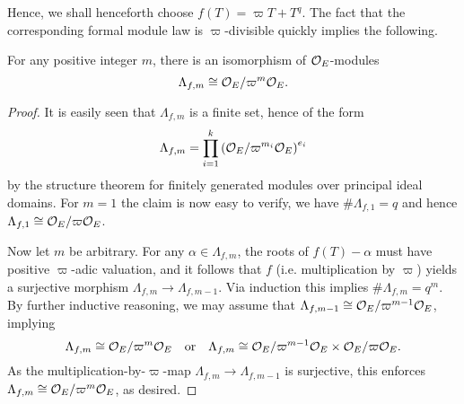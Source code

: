 \documentclass[../main.tex]{subfiles}
\begin{document}
Hence, we shall henceforth choose $f(T) = \varpi T + T^q$. 
The fact that the corresponding formal module law is $\varpi$-divisible quickly 
implies the following.
\begin{lem}\label{lem:StructureOfLambdamf}
  For any positive integer $m$, there is an isomorphism of $\mathcal{O}_E$-modules
  \begin{equation*}
    \Lambda_{f,m} \cong \mathcal{O}_E/\varpi^m\mathcal{O}_E.
  \end{equation*}
\begin{proof}
  It is easily seen that $\Lambda_{f,m}$ is a finite set, hence of the form
  \begin{equation*}
    \Lambda_{f,m} = \prod_{i = 1}^k \left(\mathcal{O}_E/\varpi^{m_i} \mathcal{O}_E \right)^{e_i}
  \end{equation*}
  by the structure theorem for finitely generated modules over principal ideal domains.
  For $m=1$ the claim is now easy to verify, we have $\# \Lambda_{f,1} = q$ and 
  hence $\Lambda_{f,1} \cong \mathcal{O}_E/\varpi\mathcal{O}_E$.

  Now let $m$ be arbitrary. For any $\alpha \in \Lambda_{f,m}$, the roots of
  $f(T) - \alpha$ must have positive $\varpi$-adic valuation, and it follows
  that $f$ (i.e. multiplication by $\varpi$) yields a
  surjective morphism $\Lambda_{f,m} \to \Lambda_{f,m-1}$. Via induction this
  implies $\# \Lambda_{f,m} = q^m$.
  By further inductive reasoning, we may assume that 
  $\Lambda_{f,m-1} \cong \mathcal{O}_E/\varpi^{m-1}\mathcal{O}_E$,  implying
  \begin{equation*}
    \Lambda_{f,m} \cong \mathcal{O}_E/\varpi^{m}\mathcal{O}_E \quad \text{or} \quad 
    \Lambda_{f,m} \cong \mathcal{O}_E/\varpi^{m-1}\mathcal{O}_E \times \mathcal{O}_E/\varpi \mathcal{O}_E.
  \end{equation*}
  As the multiplication-by-$\varpi$-map $\Lambda_{f,m} \to \Lambda_{f,m-1}$ is
  surjective, this enforces $\Lambda_{f,m} \cong \mathcal{O}_E/\varpi^m\mathcal{O}_E$, as desired.
\end{proof}
\end{lem}
\end{document}
